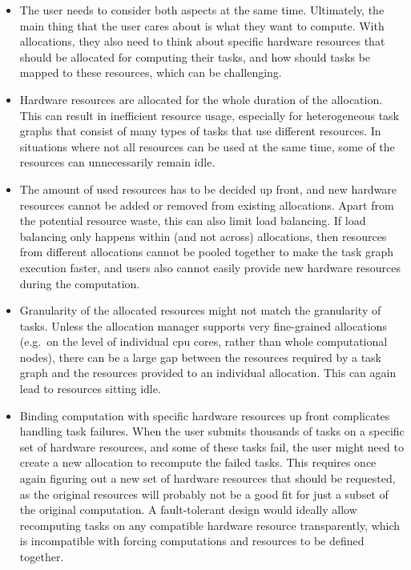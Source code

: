 \begin{itemize}
	\item The user needs to consider both aspects at the same time. Ultimately, the main thing that the user
	      cares about is what they want to compute. With allocations, they also need to think about specific
	      hardware resources that should be allocated for computing their tasks, and how should tasks be
	      mapped to these resources, which can be challenging.
	\item Hardware resources are allocated for the whole duration of the allocation. This can result in
	      inefficient resource usage, especially for heterogeneous task graphs that consist of many types of
	      tasks that use different resources. In situations where not all resources can be used at the same
	      time, some of the resources can unnecessarily remain idle.
	\item The amount of used resources has to be decided up front, and new hardware resources cannot be added
	      or removed from existing allocations. Apart from the potential resource waste, this can also limit
	      load balancing. If load balancing only happens within (and not across) allocations, then resources
	      from different allocations cannot be pooled together to make the task graph execution faster, and
	      users also cannot easily provide new hardware resources during the computation.
	\item Granularity of the allocated resources might not match the granularity of tasks. Unless the
	      allocation manager supports very fine-grained allocations (e.g.\ on the level of individual
	      \gls{cpu} cores, rather than whole computational nodes), there can be a large gap
	      between the resources required by a task graph and the resources provided to an individual
	      allocation. This can again lead to resources sitting idle.
	\item Binding computation with specific hardware resources up front complicates handling task failures.
	      When the user submits thousands of tasks on a specific set of hardware resources, and some of these
	      tasks fail, the user might need to create a new allocation to recompute the failed tasks. This
	      requires once again figuring out a new set of hardware resources that should be requested, as the
	      original resources will probably not be a good fit for just a subset of the original computation. A
	      fault-tolerant design would ideally allow recomputing tasks on any compatible hardware resource
	      transparently, which is incompatible with forcing computations and resources to be defined
	      together.
\end{itemize}

